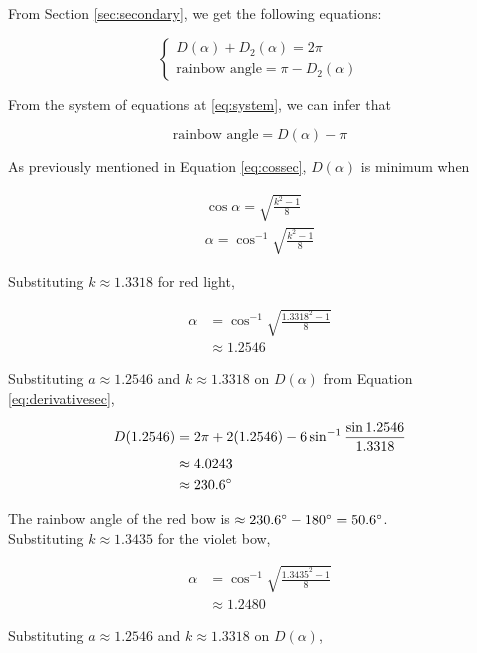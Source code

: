 \documentclass[a4paper,12pt]{article}
\begin{document}
From Section \ref{sec:secondary}, we get the following equations:

\begin{equation}
\begin{cases}
D(\alpha) + D_2(\alpha) = 2\pi\\
\text{rainbow angle} = \pi - D_2(\alpha) 
\end{cases}
\label{eq:system}
\end{equation}

From the system of equations at \eqref{eq:system}, we can infer that

\begin{equation}
\text{rainbow angle} = D(\alpha) - \pi
\end{equation}

As previously mentioned in Equation \eqref{eq:cossec}, $D(\alpha)$ is minimum when

\begin{align}
\cos \alpha = \sqrt{\frac{k^2-1}{8}} \nonumber\\
\alpha = \cos^{-1} \sqrt{\frac{k^2-1}{8}}
\end{align}

Substituting $k \approx 1.3318$ for red light,

\begin{align*}
\alpha &= \cos^{-1} \sqrt{\frac{1.3318^2-1}{8}}\\
&\approx 1.2546
\end{align*}

Substituting $a \approx 1.2546$ and $k \approx 1.3318$ on $D(\alpha)$ from Equation \ref{eq:derivativesec},

\begin{align*}
D(1.2546) &= 2\pi + 2(1.2546) - 6 \sin^{-1}{\frac{\sin 1.2546}{1.3318}}\\
&\approx 4.0243\\
&\approx 230.6 \degree
\end{align*}

The rainbow angle of the red bow is $\approx 230.6\degree - 180\degree = 50.6\degree$.\\

Substituting $k \approx 1.3435$ for the violet bow,

\begin{align*}
\alpha &= \cos^{-1} \sqrt{\frac{1.3435^2-1}{8}}\\
&\approx 1.2480
\end{align*}

Substituting $a \approx 1.2546$ and $k \approx 1.3318$ on $D(\alpha)$,
\end{document}
